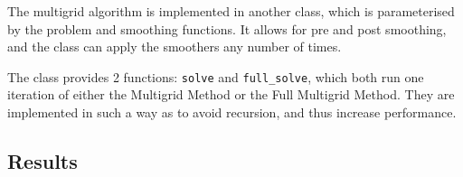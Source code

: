 \documentclass[a4paper,10pt,oneside]{book}
\theoremstyle{plain}%
\theoremstyle{definition}
\theoremstyle{remark}
\begin{document}
The multigrid algorithm is implemented in another class, which is parameterised
by the problem and smoothing functions. It allows for pre and post smoothing,
and the class can apply the smoothers any number of times.

The class provides 2 functions: \texttt{solve} and \texttt{full\_solve}, which
both run one iteration of either the Multigrid Method or the Full Multigrid
Method. They are implemented in such a way as to avoid recursion, and thus
increase performance.

\subsection{Results}



\end{document}
